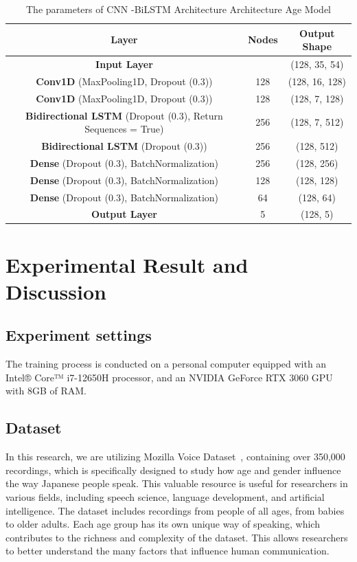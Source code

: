 \documentclass[conference, 10pt,onecolumn]{IEEEtran}
\begin{document}
\begin{table}[]
    \centering
    \begin{tabular}{|c|c|c|}
    \hline
        \textbf{Layer} & \textbf{Nodes} & \textbf{Output Shape} \\ \hline
        \textbf{Input Layer} & & (128, 35, 54)\\
        \textbf{Conv1D} (MaxPooling1D, Dropout (0.3)) & 128 & (128, 16, 128)\\
        \textbf{Conv1D} (MaxPooling1D, Dropout (0.3)) & 128 & (128, 7, 128)\\
        \textbf{Bidirectional LSTM} (Dropout (0.3), Return Sequences = True) & 256 & (128, 7, 512)\\
        \textbf{Bidirectional LSTM} (Dropout (0.3)) & 256 & (128, 512)\\
        \textbf{Dense} (Dropout (0.3), BatchNormalization) & 256 & (128, 256)\\
        \textbf{Dense} (Dropout (0.3), BatchNormalization) & 128 & (128, 128)\\
        \textbf{Dense} (Dropout (0.3), BatchNormalization) & 64 & (128, 64)\\
        \textbf{Output Layer} & 5 & (128, 5)\\
    \hline
    \end{tabular}
    \caption{The parameters of CNN -BiLSTM Architecture Architecture Age Model}
    \label{tab:CNN -BiLSTM Architecture Age}
\end{table}

\section{Experimental Result and Discussion}
\subsection{Experiment settings}

The training process is conducted on a personal computer equipped with an Intel® Core™ i7-12650H processor, and an NVIDIA GeForce RTX 3060 GPU with 8GB of RAM.
\subsection{Dataset}

In this research, we are utilizing Mozilla Voice Dataset~\cite{mozilla_voice}, containing over 350,000 recordings, which is specifically designed to study how age and gender influence the way Japanese people speak. This valuable resource is useful for researchers in various fields, including speech science, language development, and artificial intelligence. The dataset includes recordings from people of all ages, from babies to older adults. Each age group has its own unique way of speaking, which contributes to the richness and complexity of the dataset. This allows researchers to better understand the many factors that influence human communication.
\end{document}
